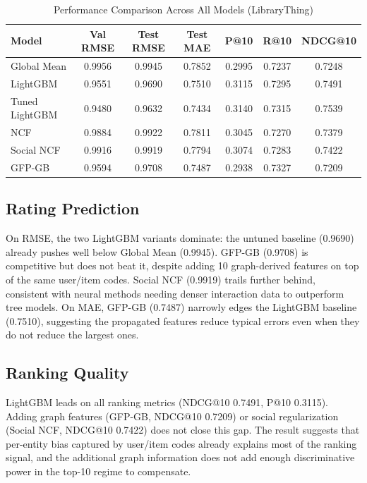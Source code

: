 \documentclass[conference]{IEEEtran}
\begin{document}
\begin{table}[htbp]
\caption{Performance Comparison Across All Models (LibraryThing)}
\label{tab:results-lthing}
\centering
\begin{tabular}{lcccccc}
\toprule
\textbf{Model} & \textbf{Val RMSE} & \textbf{Test RMSE} & \textbf{Test MAE} & \textbf{P@10} & \textbf{R@10} & \textbf{NDCG@10} \\
\midrule
Global Mean      & 0.9956 & 0.9945 & 0.7852 & 0.2995 & 0.7237 & 0.7248 \\
LightGBM         & 0.9551 & 0.9690 & 0.7510 & 0.3115 & 0.7295 & 0.7491 \\
Tuned LightGBM   & 0.9480 & 0.9632 & 0.7434 & 0.3140 & 0.7315 & 0.7539 \\
NCF              & 0.9884 & 0.9922 & 0.7811 & 0.3045 & 0.7270 & 0.7379 \\
Social NCF       & 0.9916 & 0.9919 & 0.7794 & 0.3074 & 0.7283 & 0.7422 \\
GFP-GB          & 0.9594 & 0.9708 & 0.7487 & 0.2938 & 0.7327 & 0.7209 \\
\bottomrule
\end{tabular}
\end{table}

\subsection{Rating Prediction}

On RMSE, the two LightGBM variants dominate: the untuned baseline (0.9690) 
already pushes well below Global Mean (0.9945). GFP-GB (0.9708) is competitive 
but does not beat it, despite adding 10 graph-derived features on top of the 
same user/item codes. Social NCF (0.9919) trails further behind, consistent 
with neural methods needing denser interaction data to outperform tree models. 
On MAE, GFP-GB (0.7487) narrowly edges the LightGBM baseline (0.7510), 
suggesting the propagated features reduce typical errors even when they do not 
reduce the largest ones.

\subsection{Ranking Quality}

LightGBM leads on all ranking metrics (NDCG@10 0.7491, P@10 0.3115). Adding 
graph features (GFP-GB, NDCG@10 0.7209) or social regularization (Social NCF, 
NDCG@10 0.7422) does not close this gap. The result suggests that per-entity 
bias captured by user/item codes already explains most of the ranking signal, 
and the additional graph information does not add enough discriminative power 
in the top-10 regime to compensate.
\end{document}
